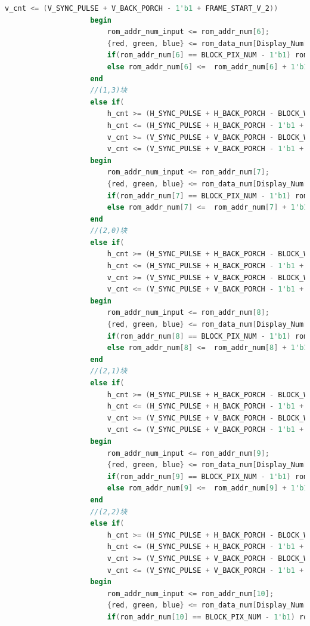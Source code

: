 \documentclass[UTF8]{article}
\begin{document}
\begin{lstlisting}[language=Verilog]
						v_cnt <= (V_SYNC_PULSE + V_BACK_PORCH - 1'b1 + FRAME_START_V_2))
					begin
						rom_addr_num_input <= rom_addr_num[6];
						{red, green, blue} <= rom_data_num[Display_Num[27:24]];
						if(rom_addr_num[6] == BLOCK_PIX_NUM - 1'b1) rom_addr_num[6] <=  13'd0;
						else rom_addr_num[6] <=  rom_addr_num[6] + 1'b1;
					end
					//(1,3)块
					else if(
						h_cnt >= (H_SYNC_PULSE + H_BACK_PORCH - BLOCK_WIDTH + FRAME_START_H_4) &&
						h_cnt <= (H_SYNC_PULSE + H_BACK_PORCH - 1'b1 + FRAME_START_H_4)  && 
						v_cnt >= (V_SYNC_PULSE + V_BACK_PORCH - BLOCK_WIDTH + FRAME_START_V_2) &&
						v_cnt <= (V_SYNC_PULSE + V_BACK_PORCH - 1'b1 + FRAME_START_V_2))
					begin
						rom_addr_num_input <= rom_addr_num[7];
						{red, green, blue} <= rom_data_num[Display_Num[31:28]];
						if(rom_addr_num[7] == BLOCK_PIX_NUM - 1'b1) rom_addr_num[7] <=  13'd0;
						else rom_addr_num[7] <=  rom_addr_num[7] + 1'b1;
					end
					//(2,0)块
					else if(
						h_cnt >= (H_SYNC_PULSE + H_BACK_PORCH - BLOCK_WIDTH + FRAME_START_H_1) &&
						h_cnt <= (H_SYNC_PULSE + H_BACK_PORCH - 1'b1 + FRAME_START_H_1) && 
						v_cnt >= (V_SYNC_PULSE + V_BACK_PORCH - BLOCK_WIDTH + FRAME_START_V_3) &&
						v_cnt <= (V_SYNC_PULSE + V_BACK_PORCH - 1'b1 + FRAME_START_V_3))
					begin
						rom_addr_num_input <= rom_addr_num[8];
						{red, green, blue} <= rom_data_num[Display_Num[35:32]];
						if(rom_addr_num[8] == BLOCK_PIX_NUM - 1'b1) rom_addr_num[8] <=  13'd0;
						else rom_addr_num[8] <=  rom_addr_num[8] + 1'b1;
					end
					//(2,1)块
					else if(
						h_cnt >= (H_SYNC_PULSE + H_BACK_PORCH - BLOCK_WIDTH + FRAME_START_H_2) &&
						h_cnt <= (H_SYNC_PULSE + H_BACK_PORCH - 1'b1 + FRAME_START_H_2)  && 
						v_cnt >= (V_SYNC_PULSE + V_BACK_PORCH - BLOCK_WIDTH + FRAME_START_V_3) &&
						v_cnt <= (V_SYNC_PULSE + V_BACK_PORCH - 1'b1 + FRAME_START_V_3))
					begin
						rom_addr_num_input <= rom_addr_num[9];
						{red, green, blue} <= rom_data_num[Display_Num[39:36]];
						if(rom_addr_num[9] == BLOCK_PIX_NUM - 1'b1) rom_addr_num[9] <=  13'd0;
						else rom_addr_num[9] <=  rom_addr_num[9] + 1'b1;
					end
					//(2,2)块
					else if(
						h_cnt >= (H_SYNC_PULSE + H_BACK_PORCH - BLOCK_WIDTH + FRAME_START_H_3) &&
						h_cnt <= (H_SYNC_PULSE + H_BACK_PORCH - 1'b1 + FRAME_START_H_3)  && 
						v_cnt >= (V_SYNC_PULSE + V_BACK_PORCH - BLOCK_WIDTH + FRAME_START_V_3) &&
						v_cnt <= (V_SYNC_PULSE + V_BACK_PORCH - 1'b1 + FRAME_START_V_3))
					begin
						rom_addr_num_input <= rom_addr_num[10];
						{red, green, blue} <= rom_data_num[Display_Num[43:40]];
						if(rom_addr_num[10] == BLOCK_PIX_NUM - 1'b1) rom_addr_num[10] <=  13'd0;

\end{lstlisting}
\end{document}
